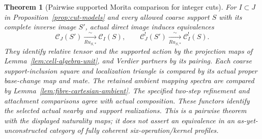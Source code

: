 \documentclass[11pt]{article}
\newtheorem{theorem}{Theorem}[section]
\theoremstyle{definition}
\theoremstyle{remark}
\begin{document}
\begin{theorem}[Pairwise supported Morita comparison for integer cuts]
\label{thm:cellular-refinement}
For $I\subset J$ in Proposition~\ref{prop:cut-models} and every allowed
coarse support $S$ with its complete inverse image $S'$, actual direct
image induces equivalences
\[
 \mathcal C_J(S')\xrightarrow[Ru_{S,*}]{\sim}\mathcal C_I(S),
 \qquad
 \mathcal C_J^!(S')\xrightarrow[Ru_{S,*}]{\sim}\mathcal C_I^!(S).
\]
They identify relative tensor and the supported action by the projection
maps of Lemma~\ref{lem:cell-algebra-unit}, and Verdier partners by its
pairing.  Each coarse support-inclusion square and localization triangle
is compared by its actual proper base-change map and mate.  The retained
ambient mapping spectra are compared by
Lemma~\ref{lem:fibre-cartesian-ambient}.  The specified two-step
refinement and attachment comparisons agree with actual composition.
These functors identify the selected actual nearby and support
realizations.  This is a pairwise theorem with the displayed naturality
maps; it does not assert an equivalence in an as-yet-unconstructed
category of fully coherent six-operation/kernel profiles.
\end{theorem}
\end{document}
